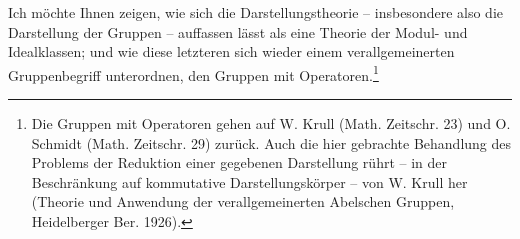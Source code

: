Ich möchte Ihnen zeigen, wie sich die Darstellungstheorie -- insbesondere also die Darstellung der Gruppen -- auffassen lässt als eine Theorie der Modul- und Idealklassen; und wie diese letzteren sich wieder einem verallgemeinerten Gruppenbegriff unterordnen, den Gruppen mit Operatoren.\footnote{Die Gruppen mit Operatoren gehen auf W. Krull (Math. Zeitschr. 23) und O. Schmidt (Math. Zeitschr. 29) zurück. Auch die hier gebrachte Behandlung des Problems der Reduktion einer gegebenen Darstellung rührt -- in der Beschränkung auf kommutative Darstellungskörper -- von W. Krull her (Theorie und Anwendung der verallgemeinerten Abelschen Gruppen, Heidelberger Ber. 1926).}
